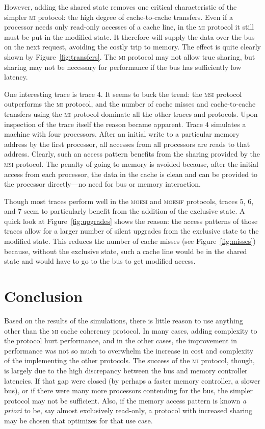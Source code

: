 \documentclass{article}
\newcommand\prot[1]{\textsc{#1}}
\newcommand\MI{\prot{mi}\xspace}
\newcommand\MSI{\prot{msi}\xspace}
\newcommand\MOESI{\prot{moesi}\xspace}
\newcommand\MOESIF{\prot{moesif}\xspace}
\begin{document}
  However, adding the shared state removes one critical characteristic
  of the simpler \MI protocol: the high degree of cache-to-cache
  transfers.  Even if a processor needs only read-only accesses of a
  cache line, in the \MI protocol it still must be put in the modified
  state. It therefore will supply the data over the bus on the next
  request, avoiding the costly trip to memory. The effect is quite
  clearly shown by Figure~\ref{fig:transfers}. The \MI protocol may
  not allow true sharing, but sharing may not be necessary for
  performance if the bus has sufficiently low latency.

  One interesting trace is trace $4$. It seems to buck the trend: the
  \MSI protocol outperforms the \MI protocol, and the number of cache
  misses and cache-to-cache transfers using the \MI protocol dominate
  all the other traces and protocols. Upon inspection of the trace
  itself the reason became apparent. Trace $4$ simulates a machine
  with four processors. After an initial write to a particular memory
  address by the first processor, all accesses from all processors are
  reads to that address. Clearly, such an access pattern benefits from
  the sharing provided by the \MSI protocol. The penalty of going to
  memory is avoided because, after the initial access from each
  processor, the data in the cache is clean and can be provided to the
  processor directly---no need for bus or memory interaction.

  Though most traces perform well in the \MOESI and \MOESIF protocols,
  traces $5$, $6$, and $7$ seem to particularly benefit from the
  addition of the exclusive state. A quick look at
  Figure~\ref{fig:upgrades} shows the reason: the access patterns of
  those traces allow for a larger number of silent upgrades from the
  exclusive state to the modified state. This reduces the number of
  cache misses (see Figure~\ref{fig:misses}) because, without the
  exclusive state, such a cache line would be in the shared state and
  would have to go to the bus to get modified access.


  \section{Conclusion}
  \label{sec:conclusion}

  Based on the results of the simulations, there is little reason to
  use anything other than the \MI cache coherency protocol. In many
  cases, adding complexity to the protocol hurt performance, and in
  the other cases, the improvement in performance was not so much to
  overwhelm the increase in cost and complexity of the implementing
  the other protocols. The success of the \MI protocol, though, is
  largely due to the high discrepancy between the bus and memory
  controller latencies. If that gap were closed (by perhaps a faster
  memory controller, a slower bus), or if there were many more
  processors contending for the bus, the simpler protocol may not be
  sufficient. Also, if the memory access pattern is known \emph{a
    priori} to be, say almost exclusively read-only, a protocol with
  increased sharing may be chosen that optimizes for that use case.

\end{document}
